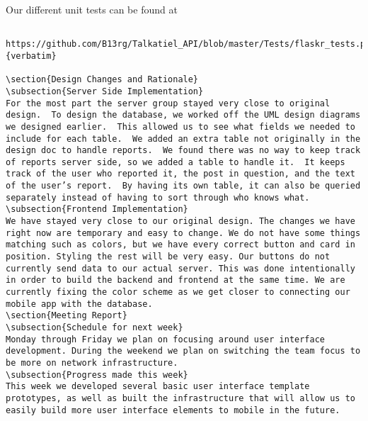 \documentclass[12pt]{article}
\begin{document}
Our different unit tests can be found at \begin{verbatim} https://github.com/B13rg/Talkatiel_API/blob/master/Tests/flaskr_tests.py {verbatim}

\section{Design Changes and Rationale}
\subsection{Server Side Implementation}
For the most part the server group stayed very close to original design.  To design the database, we worked off the UML design diagrams we designed earlier.  This allowed us to see what fields we needed to include for each table.  We added an extra table not originally in the design doc to handle reports.  We found there was no way to keep track of reports server side, so we added a table to handle it.  It keeps track of the user who reported it, the post in question, and the text of the user’s report.  By having its own table, it can also be queried separately instead of having to sort through who knows what.
\subsection{Frontend Implementation}
We have stayed very close to our original design. The changes we have right now are temporary and easy to change. We do not have some things matching such as colors, but we have every correct button and card in position. Styling the rest will be very easy. Our buttons do not currently send data to our actual server. This was done intentionally in order to build the backend and frontend at the same time. We are currently fixing the color scheme as we get closer to connecting our mobile app with the database.
\section{Meeting Report}
\subsection{Schedule for next week}
Monday through Friday we plan on focusing around user interface development. During the weekend we plan on switching the team focus to be more on network infrastructure.
\subsection{Progress made this week}
This week we developed several basic user interface template prototypes, as well as built the infrastructure that will allow us to easily build more user interface elements to mobile in the future.

\end{verbatim}
\end{document}
